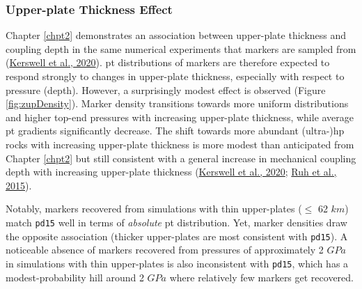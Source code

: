 \hypertarget{upper-plate-thickness-effect}{%
\subsubsection{Upper-plate Thickness Effect}\label{upper-plate-thickness-effect}}

Chapter \ref{chpt2} demonstrates an association between upper-plate thickness and coupling depth in the same numerical experiments that markers are sampled from (\protect\hyperlink{ref-kerswell2020}{Kerswell et al., 2020}). \gls{pt} distributions of markers are therefore expected to respond strongly to changes in upper-plate thickness, especially with respect to pressure (depth). However, a surprisingly modest effect is observed (Figure \ref{fig:zupDensity}). Marker density transitions towards more uniform distributions and higher top-end pressures with increasing upper-plate thickness, while average \gls{pt} gradients significantly decrease. The shift towards more abundant (ultra-)\gls{hp} rocks with increasing upper-plate thickness is more modest than anticipated from Chapter \ref{chpt2} but still consistent with a general increase in mechanical coupling depth with increasing upper-plate thickness (\protect\hyperlink{ref-kerswell2020}{Kerswell et al., 2020}; \protect\hyperlink{ref-ruh2015}{Ruh et al., 2015}).

Notably, markers recovered from simulations with thin upper-plates (\(\leq\) 62 \(km\)) match \texttt{pd15} well in terms of \emph{absolute} \gls{pt} distribution. Yet, marker densities draw the opposite association (thicker upper-plates are most consistent with \texttt{pd15}). A noticeable absence of markers recovered from pressures of approximately 2 \(GPa\) in simulations with thin upper-plates is also inconsistent with \texttt{pd15}, which has a modest-probability hill around 2 \(GPa\) where relatively few markers get recovered.



